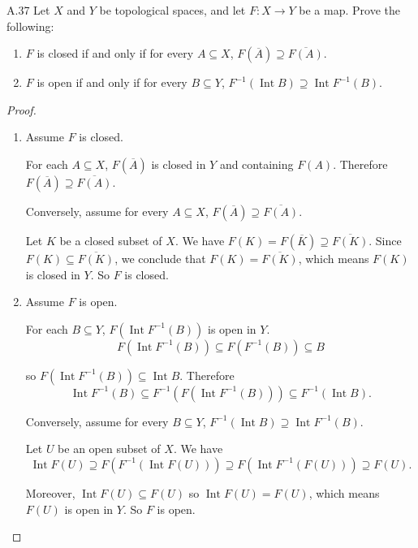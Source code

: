 \begin{exercise}{A.37}
    Let \(X\) and \(Y\) be topological spaces, and let \(F\colon X \to Y\) be a map.
    Prove the following:

    \begin{enumerate}[itemsep=0pt,label={(\alph*)}]
        \item \(F\) is closed if and only if for every \(A \subseteq X\), \(F(\overline{A}) \supseteq \overline{F(A)}\).
        \item \(F\) is open if and only if for every \(B \subseteq Y\), \(F^{-1}(\operatorname{Int} B) \supseteq \operatorname{Int} F^{-1}(B)\).
    \end{enumerate}
\end{exercise}

\begin{proof}
    \begin{enumerate}[itemsep=0pt,label={(\alph*)}]
        \item Assume \( F \) is closed.

              For each \( A \subseteq X \), \( F(\overline{A}) \) is closed in \( Y \) and containing \( F(A) \). Therefore \( F(\overline{A}) \supseteq \overline{F(A)} \).

              Conversely, assume for every \(A \subseteq X\), \(F(\overline{A}) \supseteq \overline{F(A)}\).

              Let \( K \) be a closed subset of \( X \). We have \( F(K) = F(\overline{K}) \supseteq \overline{F(K)} \). Since \( F(K) \subseteq \overline{F(K)} \), we conclude that \( F(K) = \overline{F(K)} \), which means \( F(K) \) is closed in \( Y \). So \( F \) is closed.
        \item Assume \( F \) is open.

              For each \( B \subseteq Y \), \( F(\operatorname{Int} F^{-1}(B)) \) is open in \( Y \).
              \[
                  F(\operatorname{Int} F^{-1}(B)) \subseteq F(F^{-1}(B)) \subseteq B
              \]

              so \( F(\operatorname{Int} F^{-1}(B)) \subseteq \operatorname{Int} B \). Therefore
              \[
                  \operatorname{Int} F^{-1}(B) \subseteq F^{-1}(F(\operatorname{Int} F^{-1}(B))) \subseteq F^{-1}(\operatorname{Int} B).
              \]

              Conversely, assume for every \(B \subseteq Y\), \(F^{-1}(\operatorname{Int} B) \supseteq \operatorname{Int} F^{-1}(B)\).

              Let \( U \) be an open subset of \( X \). We have
              \[
                  \operatorname{Int} F(U) \supseteq F(F^{-1}(\operatorname{Int} F(U))) \supseteq F(\operatorname{Int} F^{-1}(F(U))) \supseteq F(U).
              \]

              Moreover, \( \operatorname{Int} F(U) \subseteq F(U) \) so \( \operatorname{Int} F(U) = F(U) \), which means \( F(U) \) is open in \( Y \). So \( F \) is open.
    \end{enumerate}
\end{proof}

